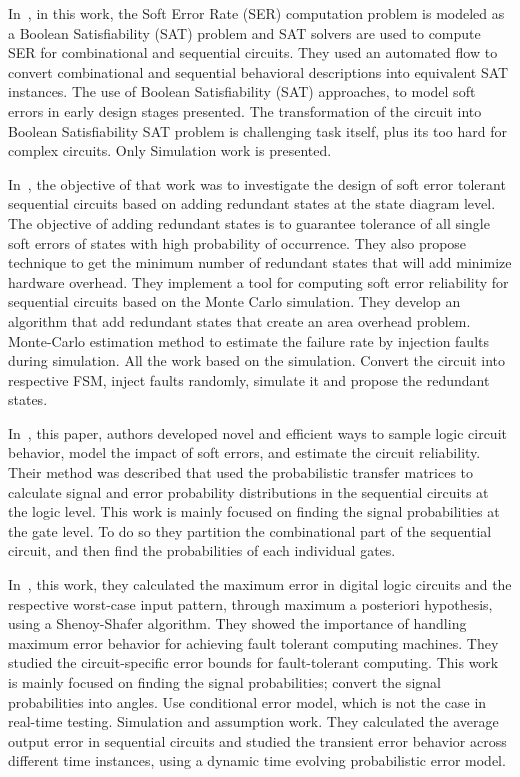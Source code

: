 In~\cite{shazli2011high}, in this work, the Soft Error Rate (SER) computation problem is modeled as a Boolean
Satisfiability (SAT) problem and SAT solvers are used to compute SER for combinational and
sequential circuits. They used an automated flow to convert combinational and sequential behavioral
descriptions into equivalent SAT instances. The use of Boolean Satisfiability (SAT) approaches, to
model soft errors in early design stages presented. The transformation of the circuit into Boolean Satisfiability SAT problem is challenging task
itself, plus its too hard for complex circuits. Only Simulation work is presented.



In~\cite{al2010fault}, the objective of that work was to investigate the design of soft error tolerant sequential
circuits based on adding redundant states at the state diagram level. The objective of adding redundant
states is to guarantee tolerance of all single soft errors of states with high probability of occurrence.
They also propose technique to get the minimum number of redundant states that will add minimize
hardware overhead. They implement a tool for computing soft error reliability for sequential circuits based on
the Monte Carlo simulation. They develop an algorithm that add redundant states that create an area
overhead problem. Monte-Carlo estimation method to estimate the failure rate by injection faults
during simulation. All the work based on the simulation. Convert the circuit into respective FSM, inject
faults randomly, simulate it and propose the redundant states.




In~\cite{yu2010scalable}, this paper, authors developed novel and efficient ways to sample logic circuit behavior,
model the impact of soft errors, and estimate the circuit reliability. Their method was described that
used the probabilistic transfer matrices to calculate signal and error probability distributions in the
sequential circuits at the logic level. This work is mainly focused on finding the signal probabilities at the gate level. To do so
they partition the combinational part of the sequential circuit, and then find the probabilities of each
individual gates.

In~\cite{lingasubramanian2010probabilistic}, this work, they calculated the maximum error in digital logic circuits and the respective
worst-case input pattern, through maximum a posteriori hypothesis, using a Shenoy-Shafer algorithm.
They showed the importance of handling maximum error behavior for achieving fault tolerant
computing machines. They studied the circuit-specific error bounds for fault-tolerant computing. This work is mainly focused on finding the signal probabilities; convert the signal
probabilities into angles. Use conditional error model, which is not the case in real-time testing.
Simulation and assumption work. They calculated the average output error in sequential circuits and
studied the transient error behavior across different time instances, using a dynamic time evolving
probabilistic error model.

